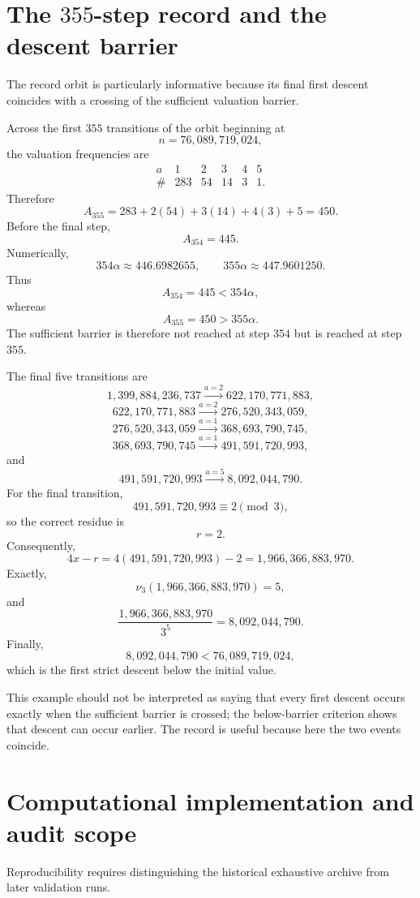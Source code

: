 \documentclass[11pt]{article}
\theoremstyle{definition}
\theoremstyle{remark}
\newcommand{\vthree}{\nu_3}
\begin{document}
\section{The \texorpdfstring{$355$}{355}-step record and the descent barrier}

The record orbit is particularly informative because its final first descent coincides with a crossing of the sufficient valuation barrier.

Across the first $355$ transitions of the orbit beginning at
\[
n=76,089,719,024,
\]
the valuation frequencies are
\[
\begin{array}{c|ccccc}
a&1&2&3&4&5\\
\hline
\#&283&54&14&3&1.
\end{array}
\]
Therefore
\[
A_{355}
=
283+2(54)+3(14)+4(3)+5
=
450.
\]
Before the final step,
\[
A_{354}=445.
\]
Numerically,
\begin{equation}
354\alpha\approx446.6982655,
\qquad
355\alpha\approx447.9601250.
\label{eq:record-barrier-values}
\end{equation}
Thus
\[
A_{354}=445<354\alpha,
\]
whereas
\[
A_{355}=450>355\alpha.
\]
The sufficient barrier is therefore not reached at step $354$ but is reached at step $355$.

The final five transitions are
\[
1,399,884,236,737
\xrightarrow{a=2}
622,170,771,883,
\]
\[
622,170,771,883
\xrightarrow{a=2}
276,520,343,059,
\]
\[
276,520,343,059
\xrightarrow{a=1}
368,693,790,745,
\]
\[
368,693,790,745
\xrightarrow{a=1}
491,591,720,993,
\]
and
\[
491,591,720,993
\xrightarrow{a=5}
8,092,044,790.
\]
For the final transition,
\[
491,591,720,993\equiv2\pmod3,
\]
so the correct residue is
\[
r=2.
\]
Consequently,
\[
4x-r
=
4(491,591,720,993)-2
=
1,966,366,883,970.
\]
Exactly,
\[
\vthree(1,966,366,883,970)=5,
\]
and
\[
\frac{1,966,366,883,970}{3^5}
=
8,092,044,790.
\]
Finally,
\[
8,092,044,790
<
76,089,719,024,
\]
which is the first strict descent below the initial value.

This example should not be interpreted as saying that every first descent occurs exactly when the sufficient barrier is crossed; the below-barrier criterion shows that descent can occur earlier.  The record is useful because here the two events coincide.

\section{Computational implementation and audit scope}

Reproducibility requires distinguishing the historical exhaustive archive from later validation runs.
\end{document}

